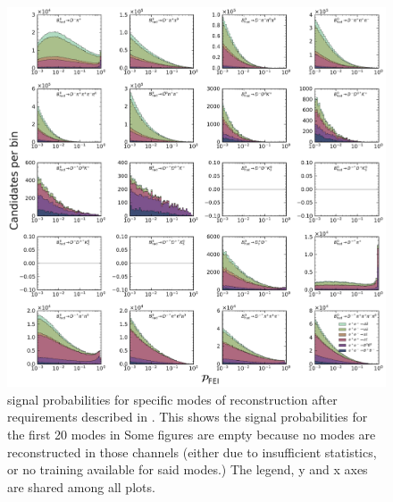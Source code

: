 \begin{figure}[htbp!]

    \includegraphics[width=1\textwidth]{figures/appendices/FEI_signal_probabilities/Bz_feiSigProbs1.pdf}

    \caption{\label{fig:feisigprobs3} \FEI signal probabilities for specific modes of \Bz reconstruction after requirements described in .
    This shows the signal probabilities for the first 20 modes in 
    Some figures are empty because no modes are reconstructed in those channels (either due to insufficient statistics, or no training available for said modes.)
    The legend, y and x axes are shared among all plots.
    }
\end{figure}

